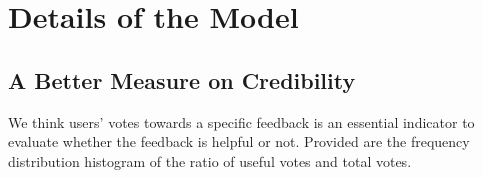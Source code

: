\documentclass{mcmthesis}
\begin{document}
\section{Details of the Model}

\subsection{A Better Measure on Credibility}\label{determine votes}
We think users' votes towards a specific feedback is an essential indicator to evaluate whether the feedback is helpful or not. Provided are the frequency distribution histogram of the ratio of useful votes and total votes.
\begin{figure}[ht]
    \centering

\end{figure}
\end{document}
